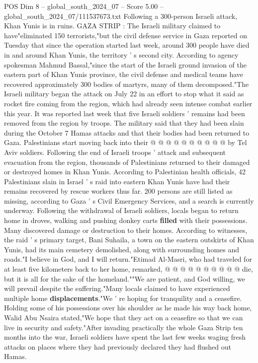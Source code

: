 \begin{textsample}{POS Dim 8 – global\_south\_2024\_07 – Score 5.00 – global\_south\_2024\_07/111537673.txt}  \label{ex:f8_pos_332}
Following a 300-person Israeli attack, Khan Yunis is in ruins.
GAZA STRIP : The Israeli military claimed to have"eliminated 150 terrorists,"but the civil defense service in Gaza reported on Tuesday that since the operation started last week, around 300 people have died in and around Khan Yunis, the territory ' s second city.
According to agency spokesman Mahmud Bassal,"since the start of the Israeli ground invasion of the eastern part of Khan Yunis province, the civil defense and medical teams have recovered approximately 300 bodies of martyrs, many of them decomposed."The Israeli military began the attack on July 22 in an effort to stop what it said as rocket fire coming from the region, which had already seen intense combat earlier this year.
It was reported last week that five Israeli soldiers ' remains had been removed from the region by troops.
The military said that they had been slain during the October 7 Hamas attacks and that their bodies had been returned to Gaza.
Palestinians start moving back into their @ @ @ @ @ @ @ @ @ @ by Tel Aviv soldiers.
Following the end of Israeli troops ' attack and subsequent evacuation from the region, thousands of Palestinians returned to their damaged or destroyed homes in Khan Yunis.
According to Palestinian health officials, 42 Palestinians slain in Israel ' s raid into eastern Khan Yunis have had their remains recovered by rescue workers thus far. 200 persons are still listed as missing, according to Gaza ' s Civil Emergency Services, and a search is currently underway.
Following the withdrawal of Israeli soldiers, locals began to return home in droves, walking and pushing donkey carts \textbf{filled} with their possessions.
Many discovered damage or destruction to their homes.
According to witnesses, the raid ' s primary target, Bani Suhaila, a town on the eastern outskirts of Khan Yunis, had its main cemetery demolished, along with surrounding homes and roads."I believe in God, and I will return."Etimad Al-Masri, who had traveled for at least five kilometers back to her home, remarked, @ @ @ @ @ @ @ @ @ @ die, but it is all for the sake of the homeland.""We are patient, and God willing, we will prevail despite the suffering."Many locals claimed to have experienced multiple home \textbf{displacements}."We ' re hoping for tranquility and a ceasefire.
Holding some of his possessions over his shoulder as he made his way back home, Walid Abu Nsaira stated,"We hope that they act on a ceasefire so that we can live in security and safety."After invading practically the whole Gaza Strip ten months into the war, Israeli soldiers have spent the last few weeks waging fresh attacks on places where they had previously declared they had flushed out Hamas.

\end{textsample}
